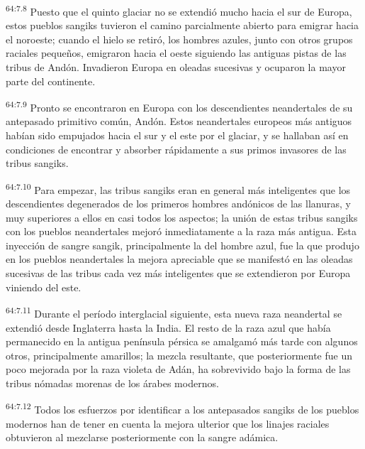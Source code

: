 \par
\textsuperscript{64:7.8} Puesto que el quinto glaciar no se extendió mucho hacia el sur de Europa, estos pueblos sangiks tuvieron el camino parcialmente abierto para emigrar hacia el noroeste; cuando el hielo se retiró, los hombres azules, junto con otros grupos raciales pequeños, emigraron hacia el oeste siguiendo las antiguas pistas de las tribus de Andón. Invadieron Europa en oleadas sucesivas y ocuparon la mayor parte del continente.

\par
\textsuperscript{64:7.9} Pronto se encontraron en Europa con los descendientes neandertales de su antepasado primitivo común, Andón. Estos neandertales europeos más antiguos habían sido empujados hacia el sur y el este por el glaciar, y se hallaban así en condiciones de encontrar y absorber rápidamente a sus primos invasores de las tribus sangiks.

\par
\textsuperscript{64:7.10} Para empezar, las tribus sangiks eran en general más inteligentes que los descendientes degenerados de los primeros hombres andónicos de las llanuras, y muy superiores a ellos en casi todos los aspectos; la unión de estas tribus sangiks con los pueblos neandertales mejoró inmediatamente a la raza más antigua. Esta inyección de sangre sangik, principalmente la del hombre azul, fue la que produjo en los pueblos neandertales la mejora apreciable que se manifestó en las oleadas sucesivas de las tribus cada vez más inteligentes que se extendieron por Europa viniendo del este.

\par
\textsuperscript{64:7.11} Durante el período interglacial siguiente, esta nueva raza neandertal se extendió desde Inglaterra hasta la India. El resto de la raza azul que había permanecido en la antigua península pérsica se amalgamó más tarde con algunos otros, principalmente amarillos; la mezcla resultante, que posteriormente fue un poco mejorada por la raza violeta de Adán, ha sobrevivido bajo la forma de las tribus nómadas morenas de los árabes modernos.

\par
\textsuperscript{64:7.12} Todos los esfuerzos por identificar a los antepasados sangiks de los pueblos modernos han de tener en cuenta la mejora ulterior que los linajes raciales obtuvieron al mezclarse posteriormente con la sangre adámica.

